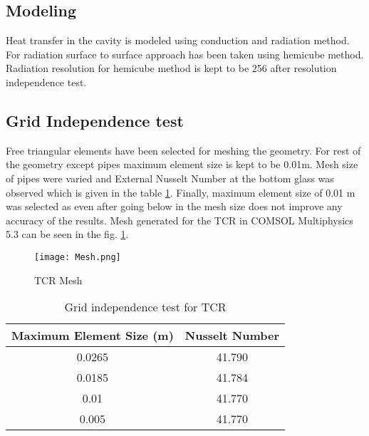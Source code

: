 \subsection{Modeling}
Heat transfer in the cavity is modeled using conduction and radiation method. For radiation surface to surface approach has been taken using hemicube method. Radiation resolution for hemicube method is kept to be 256 after resolution independence test.

\subsection{Grid Independence test}\label{subsec:gridIndTestPipeModel}
Free triangular elements have been selected for meshing the geometry. For rest of the geometry except pipes maximum element size is kept to be 0.01m. Mesh size of pipes were varied and External Nusselt Number at the bottom glass was observed which is given in the table \ref{tab:gridIndependenceTestMdelWithPipes}. Finally, maximum element size of 0.01 m was selected as even after going below in the mesh size does not improve any accuracy of the results. Mesh generated for the TCR in COMSOL Multiphysics 5.3 can be seen in the fig. \ref{fig:TCRMesh}.



\begin{figure}[H]
\begin{center}
\texttt{[image: Mesh.png]}
\caption{TCR Mesh}
\label{fig:TCRMesh}
\end{center}
\end{figure}

\begin{table}[H]
\centering
\caption{Grid independence test for TCR}
\label{tab:gridIndependenceTestMdelWithPipes}
\begin{tabular}{@{}|c|c|@{}}
\toprule
\textbf{Maximum Element Size (m)} & \textbf{Nusselt Number} \\ \midrule
0.0265                            & 41.790                  \\ \midrule
0.0185                            & 41.784                  \\ \midrule
0.01                              & 41.770                  \\ \midrule
0.005							&41.770						\\ \bottomrule
\end{tabular}
\end{table}

